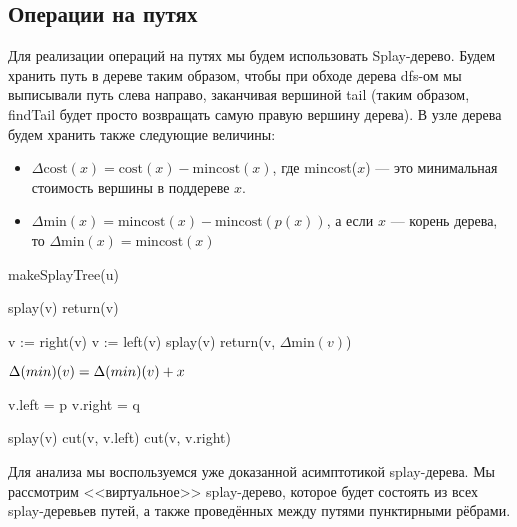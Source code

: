 \subsection{Операции на путях}

Для реализации операций на путях мы будем использовать Splay-дерево. Будем хранить путь в дереве таким образом, чтобы при обходе дерева dfs-ом мы выписывали путь слева направо, заканчивая вершиной tail (таким образом, findTail будет просто возвращать самую правую вершину дерева). В узле дерева будем хранить также следующие величины:

\begin{itemize}
    \item $\Delta \text{cost}(x) = \text{cost}(x) - \text{mincost}(x)$, где mincost($x$) --- это минимальная стоимость вершины в поддереве $x$.
    \item $\Delta \text{min}(x) = \text{mincost}(x) - \text{mincost}(p(x))$, а если $x$ --- корень дерева, то $\Delta \text{min}(x) = \text{mincost}(x)$
\end{itemize}

\begin{algorithmic}[1]
		\State makeSplayTree(u)
    \EndProcedure
    
		\State splay(v)
		\State return(v)
    \EndProcedure
    
                \State v := right(v)
            \Else
                \State v := left(v)
            \EndIf
        \EndWhile
        \State splay(v)
        \State return(v, $\Delta \text{min}(v)$)
    \EndProcedure
    
        \State $\Delta \text(min)(v) = \Delta \text(min)(v) + x$
    \EndProcedure
    
		\State v.left = p
		\State v.right = q
    \EndProcedure
    
		\State splay(v)
		\State cut(v, v.left)
		\State cut(v, v.right)
    \EndProcedure
	
\end{algorithmic}

Для анализа мы воспользуемся уже доказанной асимптотикой splay-дерева. Мы рассмотрим <<виртуальное>> splay-дерево, которое будет состоять из всех splay-деревьев путей, а также проведённых между путями пунктирными рёбрами.

